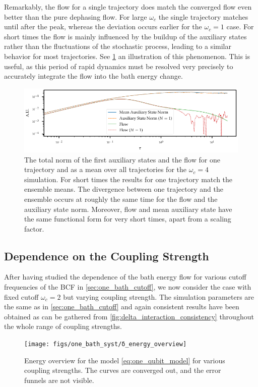 Remarkably, the flow for a single trajectory does match the converged
flow even better than the pure dephasing flow. For large \(ω_{c}\) the
single trajectory matches until after the peak, whereas the deviation
occurs earlier for the \(ω_{c}=1\) case. For short times the flow is
mainly influenced by the buildup of the auxiliary states rather than
the fluctuations of the stochastic process, leading to a similar
behavior for most trajectories. See \cref{fig:flow_buildup} an
illustration of this phenomenon. This is useful, as this period of
rapid dynamics must be resolved very precisely to accurately integrate
the flow into the bath energy change.
\begin{figure}[h]
  \centering
  \includegraphics{figs/one_bath_syst/flow_buildup}
  \caption{\label{fig:flow_buildup} The total norm of the first
    auxiliary states and the flow for one trajectory and as a mean
    over all trajectories for the \(ω_{c}=4\) simulation. For short
    times the results for one trajectory match the ensemble means. The
    divergence between one trajectory and the ensemble occurs at
    roughly the same time for the flow and the auxiliary state
    norm. Moreover, flow and mean auxiliary state have the same
    functional form for very short times, apart from a scaling factor.}
\end{figure}

\subsection{Dependence on the Coupling Strength}
\label{sec:one_bathcoup_strength}
After having studied the dependence of the bath energy flow for
various cutoff frequencies of the BCF in \cref{sec:one_bath_cutoff},
we now consider the case with fixed cutoff \(ω_c=2\) but varying
coupling strength. The simulation parameters are the same as in
\cref{sec:one_bath_cutoff} and again consistent results have been
obtained as can be gathered from
\cref{fig:delta_interaction_consistency} throughout the whole range of
coupling strengths.
\begin{figure}[h]
  \centering
  \texttt{[image: figs/one\_bath\_syst/δ\_energy\_overview]}
  \caption{\label{fig:delta_energy_overview} Energy overview for the
    model \cref{eq:one_qubit_model} for various coupling
    strengths. The curves are converged out, and the error funnels are
    not visible.}
\end{figure}

